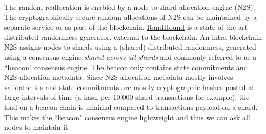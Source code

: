\documentclass{article}
\begin{document}
The random reallocation is enabled by a node to shard allocation engine (N2S). The 
cryptographically secure random allocations of N2S can be maintained by a separate service or as part of the blockchain.  \href{https://eprint.iacr.org/2016/1067.pdf}{RandHound} is a state of the art distributed randomness generator, external to the blockchain. An intra-blockchain N2S assigns nodes to shards using a (shared) distributed randomness, generated using a  consensus engine {\em shared across all shards} and commonly referred to as a ``beacon" consensus engine. The beacon only contains state commitments and N2S allocation metadata. Since N2S allocation metadata mostly involves validator ids and state-commitments are mostly cryptographic hashes posted at large intervals of time (a hash per 10,000 shard transactions for example), the load on a beacon chain is minimal compared to transactions payload on a shard. This makes the ``beacon" consensus engine lightweight and thus we can ask all nodes to maintain it. 
\end{document}
